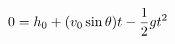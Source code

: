 \documentclass[preview]{standalone}
\begin{document}
\begin{align*}
\special{dvisvgm:raw <g id='unique000'>}0 = h_0 + (v_0 \sin\theta)t - \frac{1}{2}gt^2\special{dvisvgm:raw </g>}
\end{align*}
\end{document}
